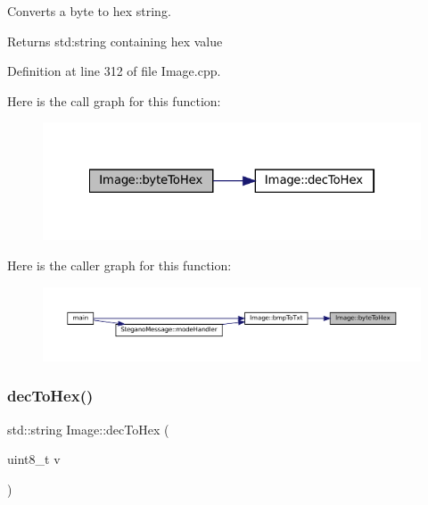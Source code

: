Converts a byte to hex string. 

\begin{DoxyReturn}{Returns}
std\+:string containing hex value 
\end{DoxyReturn}


Definition at line 312 of file Image.\+cpp.

Here is the call graph for this function\+:\nopagebreak
\begin{figure}[H]
\begin{center}
\leavevmode
\includegraphics[width=322pt]{classImage_ac1c14eba8a20f8bb71c3c21eaba90ecb_cgraph}
\end{center}
\end{figure}
Here is the caller graph for this function\+:\nopagebreak
\begin{figure}[H]
\begin{center}
\leavevmode
\includegraphics[width=350pt]{classImage_ac1c14eba8a20f8bb71c3c21eaba90ecb_icgraph}
\end{center}
\end{figure}
\mbox{\label{classImage_a26f7e0b2649e2529df7e7aea46f2da4a}} 
\subsubsection{\texorpdfstring{decToHex()}{decToHex()}}
{\footnotesize\ttfamily std\+::string Image\+::dec\+To\+Hex (\begin{DoxyParamCaption}\item[{uint8\+\_\+t}]{v }\end{DoxyParamCaption})\hspace{0.3cm}{\ttfamily [static]}}



